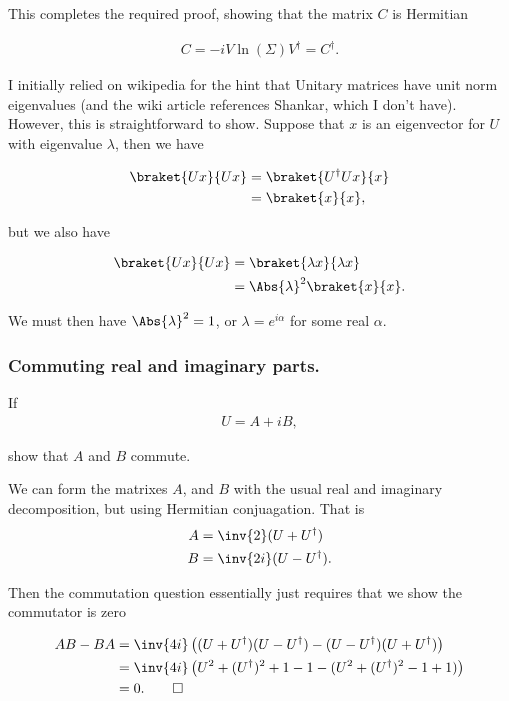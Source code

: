 This completes the required proof, showing that the matrix $C$ is Hermitian

\begin{align}\label{eqn:desaiDiracNotes:11e}
C = -i V \ln ( \Sigma ) V^\dagger = C^\dagger.
\end{align}

I initially relied on wikipedia \cite{wiki:unitary} for the hint that Unitary matrices have unit norm eigenvalues (and the wiki article references Shankar, which I don't have).  However, this is straightforward to show.  Suppose that $x$ is an eigenvector for $U$ with eigenvalue $\lambda$, then we have

\begin{align*}
\braket{U x}{U x}
&= \braket{U^\dagger U x}{x} \\
&= \braket{x}{x},
\end{align*}

but we also have

\begin{align*}
\braket{U x}{U x}
&= \braket{\lambda x}{ \lambda x} \\
&= \Abs{\lambda}^2 \braket{x}{x}.
\end{align*}

We must then have $\Abs{\lambda}^2 = 1$, or $\lambda = e^{i\alpha}$ for some real $\alpha$.

\subsubsection{Commuting real and imaginary parts.}

If 
\begin{align}\label{eqn:desaiDiracNotes:4}
U = A + iB,
\end{align}

show that $A$ and $B$ commute.

We can form the matrixes $A$, and $B$ with the usual real and imaginary decomposition, but using Hermitian conjuagation.  That is
\begin{align}\label{eqn:desaiDiracNotes:5}
A &=
\inv{2} ( U + U^\dagger ) \\
B &=
\inv{2i} ( U - U^\dagger ).
\end{align}

Then the commutation question essentially just requires that we show the commutator is zero

\begin{align*}
A B - B A 
&=
\inv{4i}\left( 
(U + U^\dagger) (U - U^\dagger)
- (U - U^\dagger) (U + U^\dagger)
\right) \\
&=
\inv{4i}\left( 
U^2 + (U^\dagger)^2 + 1 - 1
- (U^2 + (U^\dagger)^2 - 1 + 1 )
\right) \\
&= 0.\qquad \square
\end{align*}

